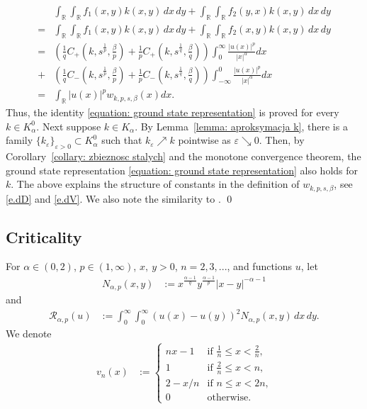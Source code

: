 \documentclass[12pt, a4paper]{amsart}
\newcommand{\R}{\mathbb{R}}
\newcommand{\RR}{\mathcal{R}}
\begin{document}
\begin{align*}
    &\int_{\R} \int_{\R} f_1(x, y)k(x, y)\,dx\,dy + \int_{\R} \int_{\R} f_2(y, x)k(x, y)\,dx\,dy 
    \\
    = &\int_{\R} \int_{\R} f_1(x, y)k(x, y)\,dx\,dy + \int_{\R} \int_{\R} f_2(x, y)k(x, y)\,dx\,dy
    \\
    = &\left(\frac{1}{q}C_+\left(k, s^{\frac{1}{p}}, \frac{\beta}{p}\right) + \frac{1}{p}C_+\left(k, s^{\frac{1}{q}}, \frac{\beta}{q}\right)\right)\int_{0}^{\infty}\frac{|u(x)|^p}{|x|^{\alpha}}dx
    \\
    + &\left(\frac{1}{q}C_-\left(k, s^{\frac{1}{p}}, \frac{\beta}{p}\right) + \frac{1}{p}C_-\left(k, s^{\frac{1}{q}}, \frac{\beta}{q}\right)\right)\int_{-\infty}^{0}\frac{|u(x)|^p}{|x|^{\alpha}}dx
    \\
    = &\int_{\R} |u(x)|^p w_{k, p, s, \beta}(x)dx.
\end{align*}
Thus, the identity \cref{equation: ground state representation} is proved for every $k \in K_\alpha^0$. Next suppose $k \in K_\alpha$. By Lemma~\ref{lemma: aproksymacja k}, there is a family $\{k_\varepsilon\}_{\varepsilon > 0} \subset K_\alpha^0$ such that $k_\varepsilon \nearrow k$ pointwise as $\varepsilon \searrow 0$. Then, by Corollary~\ref{collary: zbieznosc stalych} and the monotone convergence theorem, the ground state representation \cref{equation: ground state representation} also holds for $k$.
The above explains the structure of constants in the definition of $w_{k,p,s,\beta}$, see \eqref{e.dD} and \eqref{e.dV}.
We also note the similarity to \cite[(13)]{MR4372148}.
\qed
\subsection{Criticality}

For $\alpha \in (0, 2)$, $p \in (1, \infty)$, $x,\ y > 0$, $n = 2,3,...$, and functions $u$, let
    \begin{align*}
    N_{\alpha, p}(x, y) &:= x^{\frac{\alpha-1
    }{q}} y^{\frac{\alpha-1}{p}} |x - y|^{-\alpha-1}
    \end{align*}
    and
    \begin{align*}
    \RR_{\alpha, p}(u) &:=  \int_{0}^{\infty}\int_{0}^{\infty}\left(u(x)-u(y)\right)^{2}N_{\alpha, p}(x, y)\,dx\,dy.
\end{align*}
We denote
\begin{align*}
    v_n(x) &:=  \begin{cases}
            nx-1 & \textrm{if $\frac{1}{n} \leq x < \frac{2}{n}$,}\\
            1 & \textrm{if $\frac{2}{n}\leq x < n$,}\\
            2 - x/n & \textrm{if $n \leq x < 2n$,}\\
            0 & \textrm{otherwise.}
            \end{cases}
\end{align*}
\end{document}
